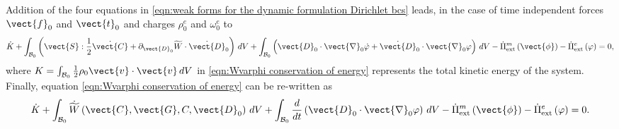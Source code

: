 Addition of the four equations in \eqref{eqn:weak forms for the dynamic formulation Dirichlet bcs} leads, in the case of time independent forces $\vect{f}_0$ and $\vect{t}_0$ and charges $\rho^e_0$ and $\omega_0^e$ to
%
\begin{equation}\label{eqn:Wvarphi conservation of energy}
\begin{aligned}
\dot{K} + \int_{\mathcal{B}_0}\left(\vect{S}:\frac{1}{2}\dot{\vect{C}}
%
+ \partial_{\vect{D}_0}\widetilde{W}\cdot\dot{\vect{D}}_0\right)\,dV + \int_{\mathcal{B}_0}\left(\vect{D}_0\cdot\vect{\nabla}_0\dot{\varphi} + \dot{\vect{D}}_0\cdot\vect{\nabla}_0\varphi\right)\,dV -\dot{\Pi}^m_{\text{ext}}\left(\vect{\phi}\right)  -\dot{\Pi}^e_{\text{ext}}\left(\varphi\right) = 0,
%
\end{aligned}
\end{equation}
%
where $K=\int_{\mathcal{B}_0}\frac{1}{2}\rho_0\vect{v}\cdot\vect{v}\,dV$ in \eqref{eqn:Wvarphi conservation of energy} represents the total kinetic energy of the system. 
%
Finally, equation \eqref{eqn:Wvarphi conservation of energy} can be re-written as
%
\begin{equation}\label{eqn:Wvarphi conservation of energy I}
\begin{aligned}
\dot{K} + \int_{\mathcal{B}_0}\dot{\widetilde{W}}\left(\vect{C},\vect{G},C,\vect{D}_0\right)\,dV 
%
+\int_{\mathcal{B}_0}\frac{d}{dt}\left(\vect{D}_0\cdot\vect{\nabla}_0{\varphi}\right)\,dV -\dot{\Pi}^m_{\text{ext}}\left(\vect{\phi}\right) - \dot{\Pi}^e_{\text{ext}}\left(\varphi\right) = 0.
%
\end{aligned}
\end{equation}


